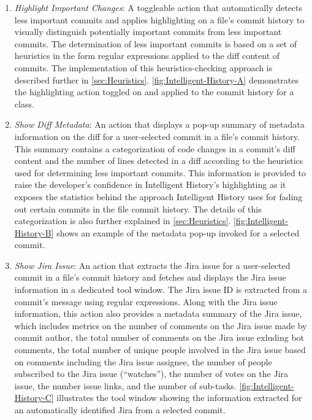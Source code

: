 \begin{enumerate}[label=(\Alph*)]
    \item \textit{Highlight Important Changes}: A toggleable action that automatically detects less important commits and applies highlighting on a file's commit history to visually distinguish potentially important commits from less important commits. The determination of less important commits is based on a set of heuristics in the form regular expressions applied to the diff content of commits. The implementation of this heuristics-checking approach is described further in \autoref{sec:Heuristics}. \autoref{fig:Intelligent-History-A} demonstrates the highlighting action toggled on and applied to the commit history for a class.
    \item \textit{Show Diff Metadata}: An action that displays a pop-up summary of metadata information on the diff for a user-selected commit in a file's commit history. This summary contains a categorization of code changes in a commit's diff content and the number of lines detected in a diff according to the heuristics used for determining less important commits. This information is provided to raise the developer's confidence in Intelligent History's highlighting as it exposes the statistics behind the approach Intelligent History uses for fading out certain commits in the file commit history. The details of this categorization is also further explained in \autoref{sec:Heuristics}. \autoref{fig:Intelligent-History-B} shows an example of the metadata pop-up invoked for a selected commit.
    \item \textit{Show Jira Issue}: An action that extracts the Jira issue  for a user-selected commit in a file's commit history and fetches and displays the Jira issue information in a dedicated tool window. The Jira issue ID is extracted from a commit's message using regular expressions. Along with the Jira issue information, this action also provides a metadata summary of the Jira issue, which includes metrics on the number of comments on the Jira issue made by commit author, the total number of comments on the Jira issue exluding bot comments, the total number of unique people involved in the Jira issue based on comments including the Jira issue assignee, the number of people subscribed to the Jira issue (``watches''), the number of votes on the Jira issue, the number issue links, and the number of sub-tasks. \autoref{fig:Intelligent-History-C} illustrates the tool window showing the information extracted for an automatically identified Jira  from a selected commit.
\end{enumerate}

